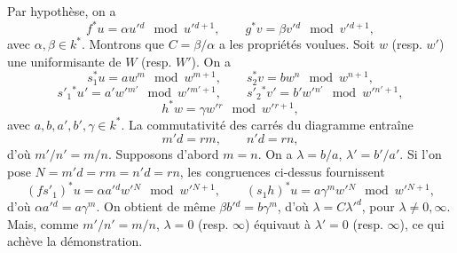 Par hypothèse, on a
\[
f^*u=\alpha u'{}^d\mod {u'{}^{d+1}},\qquad
g^*v=\beta v'{}^d\mod {v'{}^{d+1}},
\]
avec $\alpha,\beta\in k^*$. Montrons que $C=\beta/\alpha$ a les propriétés voulues. Soit $w$ (resp. $w'$) une uniformisante de $W$ (resp. $W'$). On a
\[
s_1^*u=aw^m\mod {w^{m+1}},\qquad
s_2^*v=bw^n\mod {w^{n+1}},
\]
\[
s'_1{}^*u'=a'w'{}^{m'}\mod {w'{}^{m'+1}},\qquad
s'_2{}^*v'=b'w'{}^{n'}\mod {w'{}^{n'+1}},
\]
\[
h^*w=\gamma w'{}^r\mod {w'{}^{r+1}},
\]
avec $a,b,a',b',\gamma\in k^*$. La commutativité des carrés du diagramme entraîne
\[
m'd=rm,\qquad n'd=rn,
\]
d'où $m'/n'=m/n$.
Supposons d'abord $m=n$. On a $\lambda=b/a$, $\lambda'=b'/a'$. Si l'on pose $N=m'd=rm=n'd=rn$, les congruences ci-dessus fournissent
\[
(fs'_1)^*u=\alpha a'{}^d w'{}^N\mod {w'{}^{N+1}},\qquad
(s_1h)^*u=a\gamma^m w'{}^N\mod {w'{}^{N+1}},
\]
d'où $\alpha a'{}^d=a\gamma^m$. On obtient de même $\beta b'{}^d=b\gamma^m$, d'où $\lambda=C{\lambda'}^d$, pour $\lambda\ne 0,\infty$. Mais, comme $m'/n'=m/n$, $\lambda=0$ (resp. $\infty$) équivaut à $\lambda'=0$ (resp. $\infty$), ce qui achève la démonstration.

